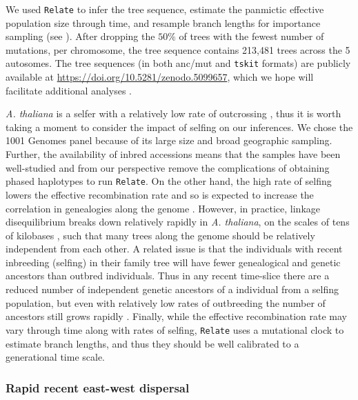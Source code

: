 \documentclass[12pt]{article}
\begin{document}
We used \texttt{Relate} \citep{speidel2019method} to infer the tree sequence, estimate the panmictic effective population size through time, and resample branch lengths for importance sampling (see ).
After dropping the $50\%$ of trees with the fewest number of mutations, per chromosome, the tree sequence contains 213,481 trees across the 5 autosomes.
The tree sequences (in both anc/mut and \texttt{tskit} formats) are publicly available at \url{https://doi.org/10.5281/zenodo.5099657}, which we hope will facilitate additional analyses \citep[e.g., inferring selection;][]{stern2019approximate,stern2020disentangling}.

\textit{A. thaliana} is a selfer with a relatively low rate of outcrossing \citep{bomblies2010local,platt2010scale}, thus it is worth taking a moment to consider the impact of selfing on our inferences. 
We chose the 1001 Genomes panel because of its large size and broad geographic sampling.
Further, the availability of inbred accessions means that the samples have been well-studied and from our perspective remove the complications of obtaining phased haplotypes to run \texttt{Relate}. 
On the other hand, the high rate of selfing lowers the effective recombination rate and so is expected to increase the correlation in genealogies along the genome \citep{nordborg2000linkage}. 
However, in practice, linkage disequilibrium breaks down relatively rapidly in \textit{A. thaliana}, on the scales of tens of kilobases \citep{kim2007recombination}, such that many trees along the genome should be relatively independent from each other. 
A related issue is that the individuals with recent inbreeding (selfing) in their family tree will have fewer genealogical and genetic ancestors than outbred individuals. 
Thus in any recent time-slice there are a reduced number of independent genetic ancestors of a individual from a selfing population, but even with relatively low rates of outbreeding the number of ancestors still grows rapidly \citep{lachance2009inbreeding}. 
Finally, while the effective recombination rate may vary through time along with rates of selfing, \texttt{Relate} uses a mutational clock to estimate branch lengths, and thus they should be well calibrated to a generational time scale.

\subsubsection*{Rapid recent east-west dispersal}
\end{document}
